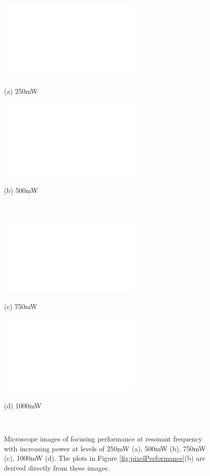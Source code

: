 \begin{figure}[htb]
  \begin{minipage}[t]{0.49\linewidth}\centering
    \includegraphics[width=7cm]{25ul250mWBaseline_3}
    \medskip
    \centerline{(a) 250mW}
  \end{minipage}\hfill
  \begin{minipage}[t]{0.49\linewidth}\centering
    \includegraphics[width=7cm]{25ul500mWBaseline_3}
    \medskip
    \centerline{(b) 500mW}
  \end{minipage}\\
  \begin{minipage}[t]{0.49\linewidth}\centering
    \includegraphics[width=7cm]{25ul750mWBaseline_3}
    \medskip
    \centerline{(c) 750mW}
  \end{minipage}\hfill
  \begin{minipage}[t]{0.49\linewidth}\centering
    \includegraphics[width=7cm]{25ul1000mWBaseline_3}
    \medskip
    \centerline{(d) 1000mW}
  \end{minipage}\\
  \caption[Microscope images at resonant frequency for increasing power levels]{Microscope images of focusing performance at resonant frequency with increasing power at levels of 250mW (a), 500mW (b), 750mW (c), 1000mW (d). The plots in Figure \ref{fig:pixelPerformance}(b) are derived directly from these images.}
	\label{fig:microscopePics}
\end{figure}

